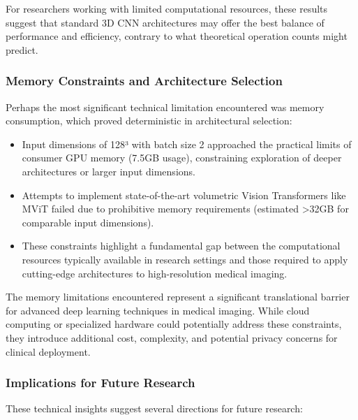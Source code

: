 \documentclass[12pt, a4paper]{article}
\begin{document}
For researchers working with limited computational resources, these results suggest that standard 3D CNN architectures may offer the best balance of performance and efficiency, contrary to what theoretical operation counts might predict.

\subsubsection{Memory Constraints and Architecture Selection}

Perhaps the most significant technical limitation encountered was memory consumption, which proved deterministic in architectural selection:

\begin{itemize}
    \item Input dimensions of 128³ with batch size 2 approached the practical limits of consumer GPU memory (7.5GB usage), constraining exploration of deeper architectures or larger input dimensions.
    
    \item Attempts to implement state-of-the-art volumetric Vision Transformers like MViT failed due to prohibitive memory requirements (estimated >32GB for comparable input dimensions).
    
    \item These constraints highlight a fundamental gap between the computational resources typically available in research settings and those required to apply cutting-edge architectures to high-resolution medical imaging.
\end{itemize}

The memory limitations encountered represent a significant translational barrier for advanced deep learning techniques in medical imaging. While cloud computing or specialized hardware could potentially address these constraints, they introduce additional cost, complexity, and potential privacy concerns for clinical deployment.

\subsubsection{Implications for Future Research}

These technical insights suggest several directions for future research:
\end{document}
